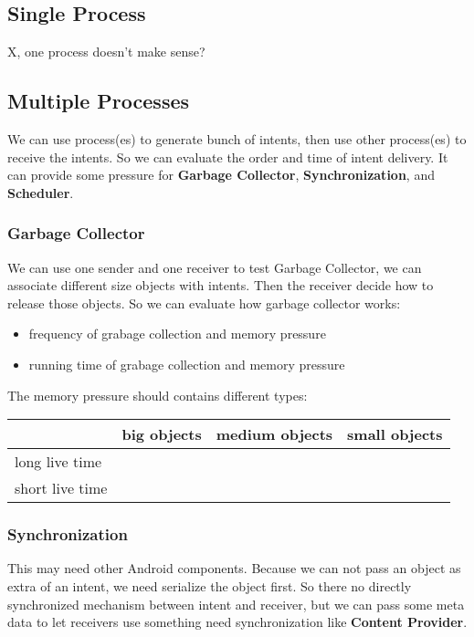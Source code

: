 \documentclass[11pt]{article}
\begin{document}
\subsection{Single Process}
\label{sec-3-1}
X, one process doesn't make sense?

\subsection{Multiple Processes}
\label{sec-3-2}
We can use process(es) to generate bunch of intents, then use other
process(es) to receive the intents.
So we can evaluate the order and time of intent delivery.
It can provide some pressure for \textbf{Garbage Collector}, \textbf{Synchronization}, and \textbf{Scheduler}.

\subsubsection{Garbage Collector}
\label{sec-3-2-1}
We can use one sender and one receiver to test Garbage Collector,
we can associate different size objects with intents.
Then the receiver decide how to release those objects.
So we can evaluate how garbage collector works:
\begin{itemize}
\item frequency of grabage collection and memory pressure
\item running time of grabage collection and memory pressure
\end{itemize}

The memory pressure should contains different types:
\begin{center}
\begin{tabular}{l|lll}
 & big objects & medium objects & small objects\\
\hline
long live time &  &  & \\
short live time &  &  & \\
\end{tabular}
\end{center}

\subsubsection{Synchronization}
\label{sec-3-2-2}
This may need other Android components.
Because we can not pass an object as extra of an intent, we need serialize the object first.
So there no directly synchronized mechanism between intent and receiver,
but we can pass some meta data to let receivers use something need synchronization like \textbf{Content Provider}.
\end{document}
